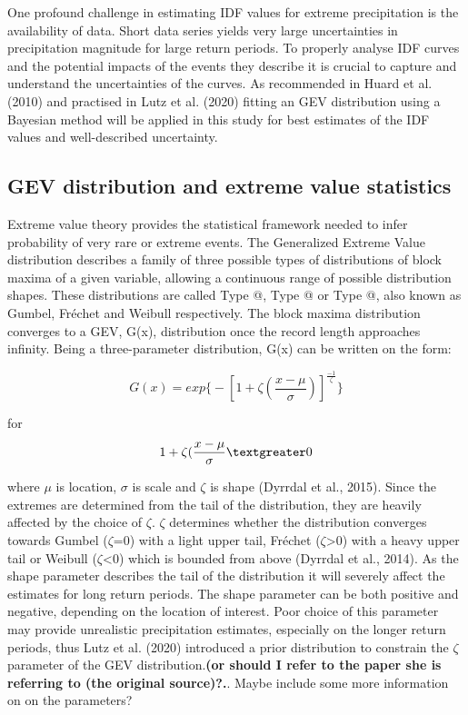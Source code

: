 \documentclass[12pt]{article}
\makeatletter
\newcommand*{\rom}[1]{\expandafter\@slowromancap\romannumeral #1@}
\makeatother
\begin{document}
{One profound challenge in estimating IDF values for extreme precipitation is the availability of data. Short data series yields very large uncertainties in precipitation magnitude for large return periods. To properly analyse IDF curves and the potential impacts of the events they describe it is crucial to capture and understand the uncertainties of the curves. As recommended in Huard et al. (2010) and practised in Lutz et al. (2020) fitting an GEV distribution using a Bayesian method will be applied in this study for best estimates of the IDF values and well-described uncertainty.  
 

\subsection{GEV distribution and extreme value statistics}

Extreme value theory provides the statistical framework needed to infer probability of very rare or extreme events. The Generalized Extreme Value distribution describes a family of three possible types of distributions of block maxima of a given variable, allowing a continuous range of possible distribution shapes. These distributions are called Type \rom{1}, Type \rom{2} or Type \rom{3}, also known as Gumbel, Fréchet and Weibull respectively. The block maxima distribution converges to a GEV, G(x), distribution once the record length approaches infinity. Being a three-parameter distribution, G(x) can be written on the form:

\begin{equation}
	G(x) = exp\bigg\{-\left[1+\zeta(\frac{x-\mu}{\sigma})\right]^\frac{-1}{\zeta}\bigg\}
	\label{eq:gev}
\end{equation}

for 
\begin{equation}
	1+\zeta(\frac{x-\mu}{\sigma} \textgreater 0
\end{equation}

where $\mu$ is location, $\sigma$ is scale and $\zeta$ is shape (Dyrrdal et al., 2015). Since the extremes are determined from the tail of the distribution, they are heavily affected by the choice of $\zeta$. $\zeta$ determines whether the distribution converges towards Gumbel ($\zeta$=0) with a light upper tail, Fréchet ($\zeta$\textgreater0) with a heavy upper tail or Weibull ($\zeta$\textless0) which is bounded from above (Dyrrdal et al., 2014). As the shape parameter describes the tail of the distribution it will severely affect the estimates for long return periods. The shape parameter can be both positive and negative, depending on the location of interest. Poor choice of this parameter may provide unrealistic precipitation estimates, especially on the longer return periods, thus Lutz et al. (2020) introduced a prior distribution to constrain the $\zeta$ parameter of the GEV distribution.\textbf{(or should I refer to the paper she is referring to (the original source)?.}. Maybe include some more information on on the parameters? 

}
\end{document}
